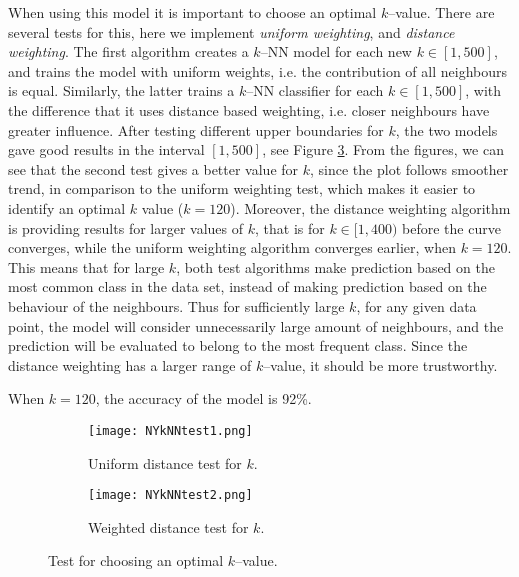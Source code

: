     When using this model it is important to choose an optimal $k$--value. There are several tests for this, here we implement \emph{uniform weighting}, and \emph{distance weighting}. The first algorithm creates a $k$--NN model for each new $k \in [1, 500]$, and trains the model with uniform weights, i.e. the contribution of all neighbours is equal. Similarly, the latter trains a $k$--NN classifier for each $k \in [1, 500]$, with the difference that it uses distance based weighting, i.e. closer neighbours have greater influence. After testing different upper boundaries for $k$, the two models gave good results in the interval $[1,500]$, see Figure \ref{fig:kNN_comparison}. From the figures, we can see that the second test gives a better value for $k$, since the plot follows smoother trend, in comparison to the uniform weighting test, which makes it easier to identify an optimal $k$ value ($k = 120$). Moreover, the distance weighting algorithm is providing results for larger values of $k$, that is for $k \in [1, 400)$ before the curve converges, while the uniform weighting algorithm converges earlier, when $k = 120$. This means that for large $k$, both test algorithms make prediction based on the most common class in the data set, instead of making prediction based on the behaviour of the neighbours. Thus for sufficiently large $k$, for any given data point, the model will consider unnecessarily large amount of neighbours, and the prediction will be evaluated to belong to the most frequent class. Since the distance weighting has a larger range of $k$--value, it should be more trustworthy.

    When $k = 120$, the accuracy of the model is 92\%.
    
    \begin{figure}[htbp]
        \centering
        \begin{subfigure}{0.45\textwidth}
            \centering
            \texttt{[image: NYkNNtest1.png]}
            \caption{Uniform distance test for $k$.}
            \label{fig:kNN_fig1}
        \end{subfigure}
        \hfill
        \begin{subfigure}{0.45\textwidth}
            \centering
            \texttt{[image: NYkNNtest2.png]}
            \caption{Weighted distance test for $k$.}
            \label{fig:kNN_fig2}
        \end{subfigure}
        \caption{Test for choosing an optimal $k$--value.}
        \label{fig:kNN_comparison}
    \end{figure}

